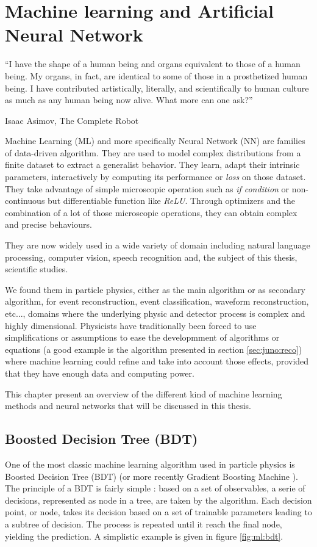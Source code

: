\documentclass[../main.tex]{subfiles}
\begin{document}
\chapter{Machine learning and Artificial Neural Network}
\label{sec:ml}

\epigraph{``I have the shape of a human being and organs equivalent to those of a human being. My organs, in fact, are identical to some of those in a prosthetized human being. I have contributed artistically, literally, and scientifically to human culture as much as any human being now alive. What more can one ask?''}{Isaac Asimov, The Complete Robot }

Machine Learning (ML) and more specifically Neural Network (NN) are families of data-driven algorithm. They are used to model complex distributions from a finite dataset to extract a generalist behavior. They learn, adapt their intrinsic parameters, interactively by computing its performance or \textit{loss} on those dataset. They take advantage of simple microscopic operation such as \textit{if condition} or non-continuous but differentiable function like \textit{ReLU}. Through optimizers and the combination of a lot of those microscopic operations, they can obtain complex and precise behaviours.

They are now widely used in a wide variety of domain including natural language processing, computer vision, speech recognition and, the subject of this thesis, scientific studies.

We found them in particle physics, either as the main algorithm or as secondary algorithm, for event reconstruction, event classification, waveform reconstruction, etc..., domains where the underlying physic and detector process is complex and highly dimensional. Physicists have traditionally been forced to use simplifications or assumptions to ease the developmment of algorithms or equations (a good example is the algorithm presented in section \ref{sec:juno:reco}) where machine learning could refine and take into account those effects, provided that they have enough data and computing power.

This chapter present an overview of the different kind of machine learning methods and neural networks that will be discussed in this thesis.
\section{Boosted Decision Tree (BDT)}
\label{sec:ml:bdt}

One of the most classic machine learning algorithm used in particle physics is Boosted Decision Tree (BDT) \cite{breiman_classification_2017} (or more recently Gradient Boosting Machine \cite{friedman_greedy_2001}). The principle of a BDT is fairly simple : based on a set of observables, a serie of decisions, represented as node in a tree, are taken by the algorithm. Each decision point, or node, takes its decision based on a set of trainable parameters leading to a subtree of decision. The process is repeated until it reach the final node, yielding the prediction. A simplistic example is given in figure \ref{fig:ml:bdt}.
\end{document}
